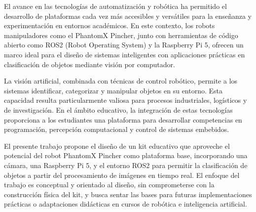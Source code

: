 El avance en las tecnologías de automatización y robótica ha permitido el desarrollo de plataformas cada vez más accesibles y versátiles para la enseñanza y experimentación en entornos académicos. En este contexto, los robots manipuladores como el PhantomX Pincher, junto con herramientas de código abierto como ROS2 (Robot Operating System) y la Raspberry Pi 5, ofrecen un marco ideal para el diseño de sistemas inteligentes con aplicaciones prácticas en clasificación de objetos mediante visión por computador.

La visión artificial, combinada con técnicas de control robótico, permite a los sistemas identificar, categorizar y manipular objetos en su entorno. Esta capacidad resulta particularmente valiosa para procesos industriales, logísticos y de investigación. En el ámbito educativo, la integración de estas tecnologías proporciona a los estudiantes una plataforma para desarrollar competencias en programación, percepción computacional y control de sistemas embebidos.

El presente trabajo propone el diseño de un kit educativo que aproveche el potencial del robot PhantomX Pincher como plataforma base, incorporando una cámara, una Raspberry Pi 5, y el entorno ROS2 para permitir la clasificación de objetos a partir del procesamiento de imágenes en tiempo real. El enfoque del trabajo es conceptual y orientado al diseño, sin comprometerse con la construcción física del kit, y busca sentar las bases para futuras implementaciones prácticas o adaptaciones didácticas en cursos de robótica e inteligencia artificial.
